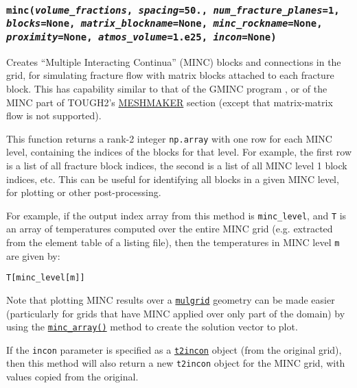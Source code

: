 \begin{snugshade}
\subsubsection{\texttt{minc(\emph{volume\_fractions}, \emph{spacing}=50., \emph{num\_fracture\_planes}=1,\\
    \emph{blocks}=None, \emph{matrix\_blockname}=None, \emph{minc\_rockname}=None,\\
    \emph{proximity}=None, \emph{atmos\_volume}=1.e25, \emph{incon}=None)}}
\end{snugshade}
\label{sec:t2grid:MINC}

Creates ``Multiple Interacting Continua'' (MINC) blocks and connections in the grid, for simulating fracture flow with matrix blocks attached to each fracture block. This has capability similar to that of the GMINC program \citep{GMINC}, or of the MINC part of TOUGH2's \hyperref[sec:t2data:meshmaker]{MESHMAKER} section (except that matrix-matrix flow is not supported).

This function returns a rank-2 integer \texttt{np.array} with one row for each MINC level, containing the indices of the blocks for that level. For example, the first row is a list of all fracture block indices, the second is a list of all MINC level 1 block indices, etc. This can be useful for identifying all blocks in a given MINC level, for plotting or other post-processing.

For example, if the output index array from this method is \texttt{minc\_level}, and \texttt{T} is an array of temperatures computed over the entire MINC grid (e.g. extracted from the element table of a listing file), then the temperatures in MINC level \texttt{m} are given by:

\begin{lstlisting}
T[minc_level[m]]
\end{lstlisting}

Note that plotting MINC results over a \hyperref[mulgrids]{\texttt{mulgrid}} geometry can be made easier (particularly for grids that have MINC applied over only part of the domain) by using the \hyperref[sec:mulgrid:minc_array]{\texttt{minc\_array()}} method to create the solution vector to plot.

If the \texttt{incon} parameter is specified as a \hyperref[incons]{\texttt{t2incon}} object (from the original grid), then this method will also return a new \texttt{t2incon} object for the MINC grid, with values copied from the original.

